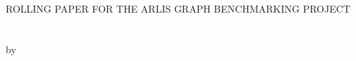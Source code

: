 
\thispagestyle{empty} \hbox{\ } \vspace{1.5in}
\renewcommand{\baselinestretch}{1}
\small\normalsize
\begin{center}

\large{{ROLLING PAPER FOR THE ARLIS GRAPH BENCHMARKING PROJECT}}\\
\ \\
\ \\
\large{by} \\
\ \\
\large{}%
\ \\
\ \\
\ \\
\ \\
\normalsize
\end{center}

\vspace{7.5em}



